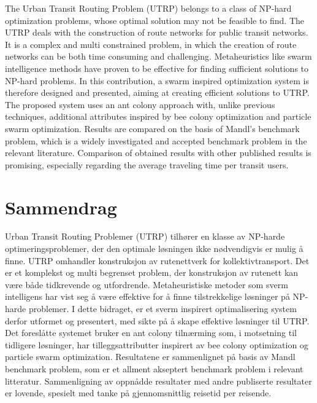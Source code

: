 

The Urban Transit Routing Problem (UTRP) belongs to a class of NP-hard optimization problems, whose optimal solution may not be feasible to find. The UTRP deals with the construction of route networks for public transit networks. It is a complex and multi constrained problem, in which the creation of route networks can be both time consuming and challenging. Metaheuristics like swarm intelligence methods have proven to be effective for finding sufficient solutions to NP-hard problems. In this contribution, a swarm inspired optimization system is therefore designed and presented, aiming at creating efficient solutions to UTRP. The proposed system uses an ant colony approach with, unlike previous techniques, additional attributes inspired by bee colony optimization and particle swarm optimization. Results are compared on the basis of Mandl's benchmark problem, which is a widely investigated and accepted benchmark problem in the relevant literature. Comparison of obtained results with other published results is promising, especially regarding the average traveling time per transit users.


\section*{Sammendrag}

Urban Transit Routing Problemer (UTRP) tilhører en klasse av NP-harde optimeringsproblemer, der den optimale løsningen ikke nødvendigvis er mulig å finne. UTRP omhandler konstruksjon av rutenettverk for kollektivtransport. Det er et komplekst og multi begrenset problem, der konstruksjon av rutenett kan være både tidkrevende og utfordrende. Metaheuristiske metoder som sverm intelligens har vist seg å være effektive for å finne tilstrekkelige løsninger på NP-harde problemer. I dette bidraget, er et sverm inspirert optimalisering system derfor utformet og presentert, med sikte på å skape effektive løsninger til UTRP. Det foreslåtte systemet bruker en ant colony tilnærming som, i motsetning til tidligere løsninger, har tilleggsattributter inspirert av bee colony optimization og particle swarm optimization. Resultatene er sammenlignet på basis av Mandl benchmark problem, som er et allment akseptert benchmark problem i  relevant litteratur. Sammenligning av oppnådde resultater med andre publiserte resultater er lovende, spesielt med tanke på gjennomsnittlig reisetid per reisende.
